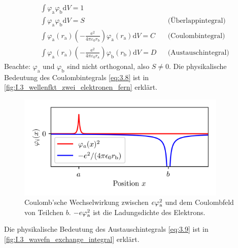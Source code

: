     \begin{align}
        \nonumber
        &\int \varphi_\text{a} \varphi_\text{b} \mathrm{d}V = 1\\
        \nonumber
        &\int \varphi_\text{a} \varphi_\text{b} \mathrm{d}V = S &&\text{(Überlappintegral)}\\
        \label{eq:3.8}
        &\int \varphi_\text{a} \left( r_\text{a} \right) \left( - \frac{\mathrm{e}^2}{4\pi \varepsilon_0 r_\text{b}}  \right) \varphi_\text{a}\left( r_\text{a} \right) \mathrm{d}V = C &&\text{(Coulombintegral)} \\
        \label{eq:3.9}
        &\int \varphi_\text{a} \left( r_\text{a} \right) \left( - \frac{\mathrm{e}^2}{4 \pi \varepsilon_0 r_\text{a}}  \right) \varphi_\text{b}\left( r_\text{b} \right) \mathrm{d}V = D &&\text{(Austauschintegral)}
    \end{align}
    Beachte: $ \varphi_\text{a}$ und $ \varphi_\text{b}$ sind nicht orthogonal, also $ S\neq 0$. 
    Die physikalische Bedeutung des Coulombintegrals \eqref{eq:3.8} ist in \autoref{fig:I.3_wellenfkt_zwei_elektronen_fern} erklärt.\\
    
    \begin{figure}[H]
        \centering
        \includegraphics[width=10cm]{figures/vl04/wavefn_coulomb_integral.png}
        \caption{Coulomb'sche Wechselwirkung zwischen $e\varphi_\text a^2$ und dem Coulombfeld von Teilchen $b$. $-e\varphi^2_\text a$ ist die Ladungsdichte des Elektrons.}
        \label{fig:I.3_wavefn_coulomb_integral}
    \end{figure}

    Die physikalische Bedeutung des Austauschintegrals \eqref{eq:3.9} ist in \autoref{fig:I.3_wavefn_exchange_integral} erklärt.

